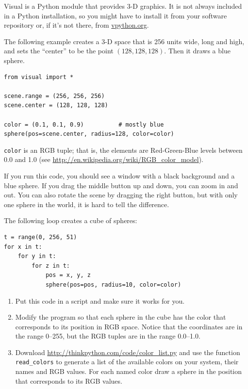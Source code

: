 \documentclass[10pt]{book}
\begin{document}
\begin{CJK}{UTF8}{gbsn}
\begin{exercise}

Visual is a Python module that provides 3-D graphics.  It is
not always included in a Python installation, so you might have
to install it from your software repository or, if it's not there,
from \url{vpython.org}.

The following example creates a 3-D space that is 256 units
wide, long and high, and sets the ``center'' to be the
point $(128,128,128)$.  Then it draws a blue sphere.

\begin{verbatim}
from visual import *

scene.range = (256, 256, 256)
scene.center = (128, 128, 128)

color = (0.1, 0.1, 0.9)          # mostly blue
sphere(pos=scene.center, radius=128, color=color)
\end{verbatim}

{\tt color} is an RGB tuple; that is, the elements are Red-Green-Blue
levels between 0.0 and 1.0 (see
\url{http://en.wikipedia.org/wiki/RGB_color_model}).

If you run this code, you should see a window with a black
background and a blue sphere.  If you drag the middle button
up and down, you can zoom in and out.  You can also rotate
the scene by dragging the right button, but with only one
sphere in the world, it is hard to tell the difference.

The following loop creates a cube of spheres:

\begin{verbatim}
t = range(0, 256, 51)
for x in t:
    for y in t:
        for z in t:
            pos = x, y, z
            sphere(pos=pos, radius=10, color=color)
\end{verbatim}

\begin{enumerate}

\item Put this code in a script and make sure it works for
you.

\item Modify the program so that each sphere in the cube
has the color that corresponds to its position in RGB space.
Notice that the coordinates are in the range 0--255, but
the RGB tuples are in the range 0.0--1.0.

\item Download \url{http://thinkpython.com/code/color_list.py}
and use the function \verb"read_colors" to generate a list
of the available colors on your system, their names and
RGB values.  For each named color draw a sphere in the
position that corresponds to its RGB values.




\end{enumerate}
\end{exercise}
\end{CJK}
\end{document}
